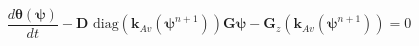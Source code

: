 \begin{equation}
\label{eq:richards-mixed:discrete}
\frac{d \boldsymbol{\theta}(\boldsymbol{\psi})}{d t}
- \mathbf{D}
    \text{ diag}
    \left(
        \mathbf{k}_{Av}(\boldsymbol{\psi}^{n+1})
    \right)
\mathbf{G} \boldsymbol{\psi}
- \mathbf{G}_z
    \left(
        \mathbf{k}_{Av}(\boldsymbol{\psi}^{n+1})
    \right)
=0
\end{equation}
